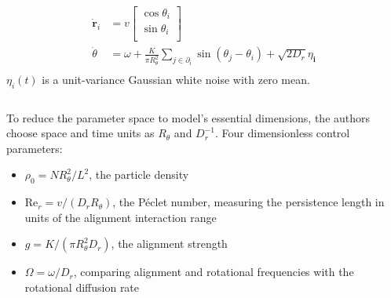 \documentclass[10pt,aspectratio=43,mathserif,table]{beamer}
\begin{document}
\begin{frame}
    \begin{multicols}{2}
        {
        \small
        $$
        \begin{aligned}
            \dot{\mathbf{r}}_i&=v\left[ \begin{array}{c}
            \cos \theta _i\\
            \sin \theta _i\\
        \end{array} \right]\\
            \dot{\theta}&=\omega +\frac{K}{\pi R_{\theta}^{2}}\sum_{j\in \partial _i}{\sin \left( \theta _j-\theta _i \right) +\sqrt{2D_r}\eta _{\boldsymbol{i}}}\\
        \end{aligned}
        $$
        $\eta_i(t)$ is a unit-variance Gaussian white noise with zero mean.
        
        $$ $$
        
        {
            \small
            To reduce the parameter space to model's essential dimensions, the authors choose space and time units as $R_{\theta}$ and $D_r^{-1}$. 
            Four dimensionless control parameters:
        }
        \begin{itemize}
            \item $\rho _0=NR_{\theta}^{2}/L^2$, the particle density
            \item $\mathrm{Re}_r=v/\left( D_rR_{\theta} \right) $, the P\'{e}clet number, measuring the persistence length in units of the alignment interaction range
            \item $g=K/\left( \pi R_{\theta}^{2}D_r \right) $, the alignment strength
            \item $\Omega=\omega/D_r$, comparing alignment and rotational frequencies with the rotational diffusion rate
        \end{itemize}

        }
    \end{multicols}
\end{frame}
\end{document}
